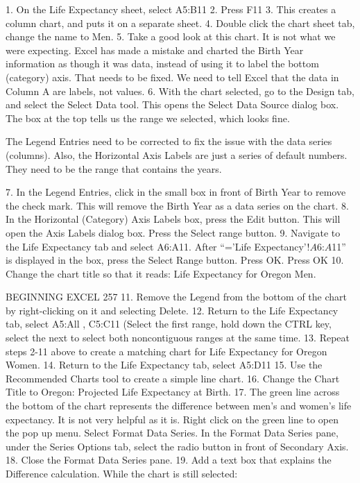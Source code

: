 1. On the Life Expectancy sheet, select A5:B11
2. Press F11
3. This creates a column chart, and puts it on a separate sheet.
4. Double click the chart sheet tab, change the name to Men.
5. Take a good look at this chart. It is not what we were expecting. Excel has made a mistake and
charted the Birth Year information as though it was data, instead of using it to label the bottom
(category) axis. That needs to be fixed. We need to tell Excel that the data in Column A are labels,
not values.
6. With the chart selected, go to the Design tab, and select the Select Data tool.
This opens the Select Data Source dialog box. The box at the top tells us the range we selected,
which looks fine.

The Legend Entries need to be corrected to fix the issue with the data series (columns). Also, the
Horizontal Axis Labels are just a series of default numbers. They need to be the range that contains
the years.

7. In the Legend Entries, click in the small box in front of Birth Year to remove the check mark.
This will remove the Birth Year as a data series on the chart.
8. In the Horizontal (Category) Axis Labels box, press the Edit button. This will open the Axis
Labels dialog box. Press the Select range button.
9. Navigate to the Life Expectancy tab and select A6:A11. After “=’Life Expectancy’!$A$6:$A$11”
is displayed in the box, press the Select Range button. Press OK.
Press OK
10. Change the chart title so that it reads: Life Expectancy for Oregon Men.

BEGINNING EXCEL 257
11. Remove the Legend from the bottom of the chart by right-clicking on it and selecting Delete.
12. Return to the Life Expectancy tab, select A5:All , C5:C11 (Select the first range, hold down the
CTRL key, select the next to select both noncontiguous ranges at the same time.
13. Repeat steps 2-11 above to create a matching chart for Life Expectancy for Oregon Women.
14. Return to the Life Expectancy tab, select A5:D11
15. Use the Recommended Charts tool to create a simple line chart.
16. Change the Chart Title to Oregon: Projected Life Expectancy at Birth.
17. The green line across the bottom of the chart represents the difference between men’s and
women’s life expectancy. It is not very helpful as it is.
Right click on the green line to open the pop up menu. Select Format Data Series. In the
Format Data Series pane, under the Series Options tab, select the radio button in front of
Secondary Axis.
18. Close the Format Data Series pane.
19. Add a text box that explains the Difference calculation. While the chart is still selected:

